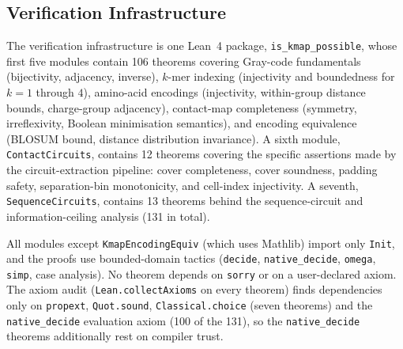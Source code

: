 \subsection{Verification Infrastructure}
The verification infrastructure is one Lean~4 package,
\texttt{is\_kmap\_possible}, whose first five modules contain 106 theorems
covering Gray-code fundamentals (bijectivity, adjacency, inverse),
$k$-mer indexing (injectivity and boundedness for $k = 1$ through $4$),
amino-acid encodings (injectivity, within-group distance bounds, charge-group
adjacency), contact-map completeness (symmetry, irreflexivity, Boolean
minimisation semantics), and encoding equivalence (BLOSUM bound, distance
distribution invariance).  A sixth module, \texttt{ContactCircuits}, contains
12 theorems covering the specific assertions made by the circuit-extraction
pipeline: cover completeness, cover soundness, padding safety, separation-bin
monotonicity, and cell-index injectivity.  A seventh, \texttt{SequenceCircuits},
contains 13 theorems behind the sequence-circuit and information-ceiling
analysis (131 in total).

All modules except \texttt{KmapEncodingEquiv} (which uses Mathlib) import only
\texttt{Init}, and the proofs use bounded-domain tactics (\texttt{decide},
\texttt{native\_decide}, \texttt{omega}, \texttt{simp}, case analysis).  No
theorem depends on \texttt{sorry} or on a user-declared axiom.  The axiom
audit (\texttt{Lean.collectAxioms} on every theorem) finds dependencies only on
\texttt{propext}, \texttt{Quot.sound}, \texttt{Classical.choice} (seven
theorems) and the \texttt{native\_decide} evaluation axiom (100 of the 131), so
the \texttt{native\_decide} theorems additionally rest on compiler trust.
